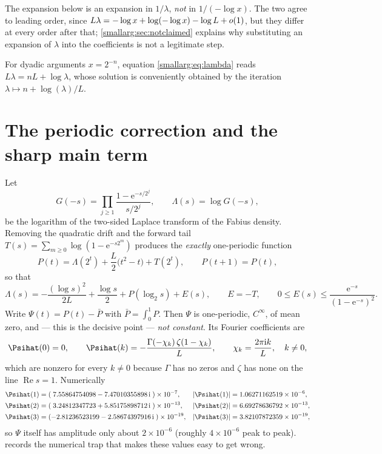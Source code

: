 \documentclass[11pt,oneside]{article}
\theoremstyle{definition}
\theoremstyle{remark}
\newcommand{\e}{\mathrm e}
\newcommand{\ii}{\mathrm i}
\begin{document}
The expansion below is an expansion in $1/\lambda$, \emph{not} in $1/(-\log x)$.
The two agree to leading order, since
$L\lambda=-\log x+\log(-\log x)-\log L+\smash{o(1)}$, but they differ at every
order after that; \cref{smallarg:sec:notclaimed} explains why substituting an expansion
of $\lambda$ into the coefficients is not a legitimate step.

For dyadic arguments $x=2^{-n}$, equation \cref{smallarg:eq:lambda} reads
$L\lambda=nL+\log\lambda$, whose solution is conveniently obtained by the
iteration $\lambda\mapsto n+\log(\lambda)/L$.

\section{The periodic correction and the sharp main term}\label{smallarg:sec:main}

Let
\[
  G(-s)=\prod_{j\ge1}\frac{1-\e^{-s/2^j}}{s/2^j},
  \qquad \Lambda(s)=\log G(-s),
\]
be the logarithm of the two-sided Laplace transform of the Fabius density.
Removing the quadratic drift and the forward tail
$T(s)=\sum_{m\ge0}\log(1-\e^{-s2^m})$ produces the \emph{exactly} one-periodic
function
\[
  P(t)=\Lambda(2^t)+\frac L2\bigl(t^2-t\bigr)+T(2^t),
  \qquad P(t+1)=P(t),
\]
so that
\[
  \Lambda(s)=-\frac{(\log s)^2}{2L}+\frac{\log s}{2}+P(\log_2s)+E(s),
  \qquad E=-T,\qquad
  0\le E(s)\le\frac{\e^{-s}}{(1-\e^{-s})^2}.
\]
Write $\Psi(t)=P(t)-\bar P$ with $\bar P=\int_0^1P$.  Then $\Psi$ is
one-periodic, $C^\infty$, of mean zero, and --- this is the decisive point ---
\emph{not constant}.  Its Fourier coefficients are
\begin{equation}\label{smallarg:eq:psihat}
  \Psihat(0)=0,\qquad
  \Psihat(k)=-\frac{\Gamma(-\chi_k)\,\zeta(1-\chi_k)}{L},
  \qquad \chi_k=\frac{2\pi\ii k}{L},\quad k\ne0,
\end{equation}
which are nonzero for every $k\ne0$ because $\Gamma$ has no zeros and $\zeta$
has none on the line $\operatorname{Re}s=1$.  Numerically
\[
\begin{aligned}
  \Psihat(1)&=(\;7.55864754098-7.47010355898\,\ii\;)\times10^{-7},
    &|\Psihat(1)|&=1.06271162519\times10^{-6},\\
  \Psihat(2)&=(\;3.24812347723+5.85175898712\,\ii\;)\times10^{-13},
    &|\Psihat(2)|&=6.69278636792\times10^{-13},\\
  \Psihat(3)&=(-2.81236523199-2.58674397916\,\ii\;)\times10^{-19},
    &|\Psihat(3)|&=3.82107872359\times10^{-19},
\end{aligned}
\]
so \(\Psi\) itself has amplitude only about \(2\times10^{-6}\) (roughly
\(4\times10^{-6}\) peak to peak).  
records the numerical trap that makes these values easy to get wrong.
\end{document}
